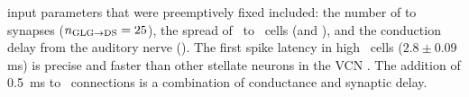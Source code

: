 \DS input parameters that were preemptively fixed included: the number of \GLG to \DS synapses ($\protect n_{\protect\textrm{{GLG}}\to\textrm{{DS}}} = 25$), the spread of \ANFs~to \DS~cells (\sANFDSh and \sANFDSl), and the conduction delay from the auditory nerve (\dANFDS). 
The first spike latency in high \CF \DS~cells ($2.8 \pm 0.09$ ms) is precise and faster than other stellate neurons in the VCN \citep{RhodeSmith:1986}.
The addition of 0.5~ms to \ANFDS~connections is a combination of conductance and synaptic delay.




